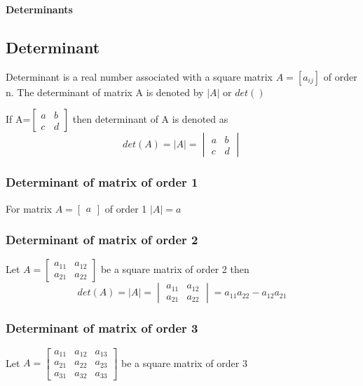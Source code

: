 \documentclass[12pt]{article}
\begin{document}
\begin{center}
    {\LARGE \textbf{Determinants} }
\end{center}

    


\subsection*{Determinant}
Determinant is a real number associated with a square matrix $A=[a_{ij}]$ of order n. The determinant of matrix A is denoted by $|A|$ or $det()$

If A=$\begin{bmatrix}
    a & b \\
    c & d
\end{bmatrix}$ then determinant of A  is denoted as $$det(A)=|A|=\begin{vmatrix} 
    a & b \\
    c & d
\end{vmatrix}$$

\subsubsection*{Determinant of matrix of order 1}
For matrix $A=\begin{bmatrix}
    a
\end{bmatrix}$ of order 1 $|A|=a$

\subsubsection*{Determinant of matrix of order 2}
Let $A=\begin{bmatrix}
    a_{11} & a_{12} \\
    a_{21} & a_{22} 
\end{bmatrix}$ be a square matrix of order 2 then  $$det(A)=|A|=\begin{vmatrix}
    a_{11} & a_{12} \\
    a_{21} & a_{22} 
\end{vmatrix} = a_{11}a_{22}-a_{12}a_{21}$$

\subsubsection*{Determinant of matrix of order 3}
Let $A=\begin{bmatrix}
    a_{11} & a_{12} & a_{13} \\
    a_{21} & a_{22} & a_{23} \\
    a_{31} & a_{32} & a_{33}
\end{bmatrix}$ be a square matrix of order 3
\end{document}
